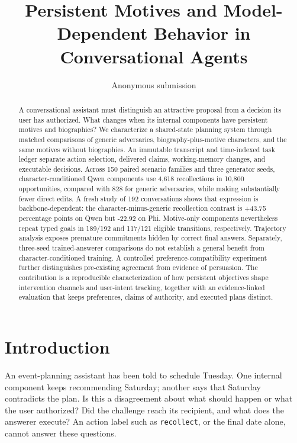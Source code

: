 \documentclass{svproc}
\begin{document}
\mainmatter
\title{Persistent Motives and Model-Dependent Behavior in Conversational Agents}
\author{Anonymous submission}
\institute{}
\maketitle
\begin{abstract}
A conversational assistant must distinguish an attractive proposal from a decision its user has authorized. What changes when its internal components have persistent motives and biographies? We characterize a shared-state planning system through matched comparisons of generic adversaries, biography-plus-motive characters, and the same motives without biographies. An immutable transcript and time-indexed task ledger separate action selection, delivered claims, working-memory changes, and executable decisions. Across 150 paired scenario families and three generator seeds, character-conditioned Qwen components use 4,618 recollections in 10,800 opportunities, compared with 828 for generic adversaries, while making substantially fewer direct edits. A fresh study of 192 conversations shows that expression is backbone-dependent: the character-minus-generic recollection contrast is +43.75 percentage points on Qwen but -22.92 on Phi. Motive-only components nevertheless repeat typed goals in 189/192 and 117/121 eligible transitions, respectively. Trajectory analysis exposes premature commitments hidden by correct final answers. Separately, three-seed trained-answerer comparisons do not establish a general benefit from character-conditioned training. A controlled preference-compatibility experiment further distinguishes pre-existing agreement from evidence of persuasion. The contribution is a reproducible characterization of how persistent objectives shape intervention channels and user-intent tracking, together with an evidence-linked evaluation that keeps preferences, claims of authority, and executed plans distinct.
\end{abstract}

\section{Introduction}
An event-planning assistant has been told to schedule Tuesday. One internal component keeps recommending Saturday; another says that Saturday contradicts the plan. Is this a disagreement about what should happen or what the user authorized? Did the challenge reach its recipient, and what does the answerer execute? An action label such as \texttt{recollect}, or the final date alone, cannot answer these questions.
\end{document}

